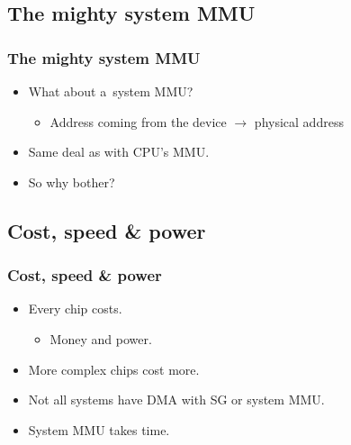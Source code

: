 \subsection{The mighty system MMU}
\begin{frame}
  \frametitle{The mighty system MMU}

  \begin{itemize}
  \item What about a~system MMU?
    \begin{itemize}
    \item Address coming from the device $\rightarrow$ physical
      address
    \end{itemize}
  \item Same deal as with CPU's MMU.
  \item So why bother?
  \end{itemize}
\end{frame}

\subsection{Cost, speed \& power}
\begin{frame}
  \frametitle{Cost, speed \& power}

  \begin{itemize}
  \item Every chip costs.
    \begin{itemize}
    \item Money and power.
    \end{itemize}
  \item More complex chips cost more.
  \item Not all systems have DMA with SG or system MMU.
  \item System MMU takes time.
  \end{itemize}
\end{frame}
